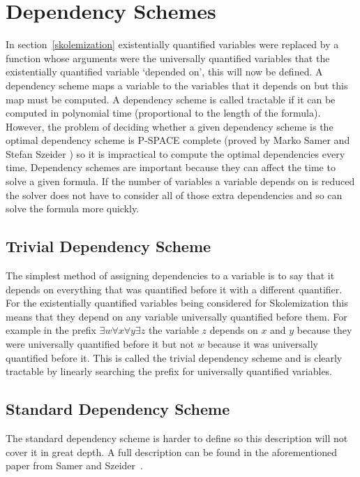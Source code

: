 \section{Dependency Schemes} \label{dependencyschemes}
In section~\ref{skolemization} existentially quantified variables were replaced by a function whose arguments were the universally quantified variables that the existentially quantified variable `depended on', this will now be defined. A dependency scheme maps a variable to the variables that it depends on but this map must be computed. A dependency scheme is called tractable if it can be computed in polynomial time (proportional to the length of the formula). However, the problem of deciding whether a given dependency scheme is the optimal dependency scheme is P-SPACE complete (proved by Marko Samer and Stefan Szeider \cite{backdoorsets}) so it is impractical to compute the optimal dependencies every time.
Dependency schemes are important because they can affect the time to solve a given formula. If the number of variables a variable depends on is reduced the solver does not have to consider all of those extra dependencies and so can solve the formula more quickly.

\subsection{Trivial Dependency Scheme}
The simplest method of assigning dependencies to a variable is to say that it depends on everything that was quantified before it with a different quantifier. For the existentially quantified variables being considered for Skolemization this means that they depend on any variable universally quantified before them. For example in the prefix $\exists w \forall x \forall y \exists z$ the variable $z$ depends on $x$ and $y$ because they were universally quantified before it but not $w$ because it was universally quantified before it. This is called the trivial dependency scheme and is clearly tractable by linearly searching the prefix for universally quantified variables.

\subsection{Standard Dependency Scheme} \label{stddepscheme}
The standard dependency scheme is harder to define so this description will not cover it in great depth. A full description can be found in the aforementioned paper from Samer and Szeider~\cite{backdoorsets}.

